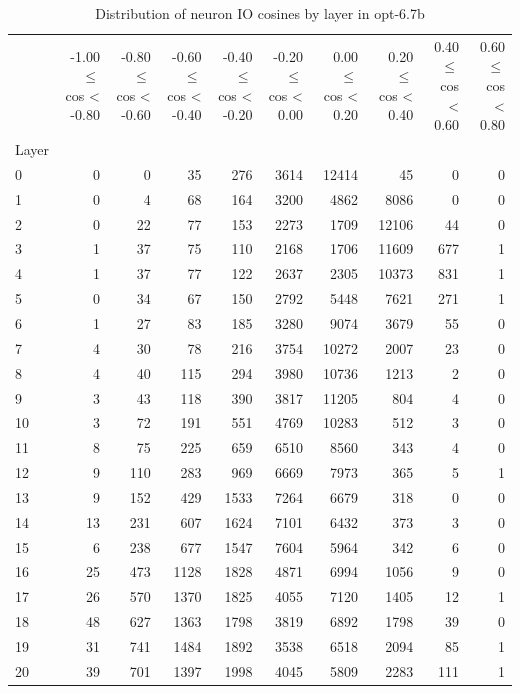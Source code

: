 \begin{table}
\caption{Distribution of neuron IO cosines by layer in opt-6.7b}
\label{tab:opt-6.7b_half_coarse}
\begin{tabular}{lrrrrrrrrr}
 & -1.00 $\leq$ cos < -0.80 & -0.80 $\leq$ cos < -0.60 & -0.60 $\leq$ cos < -0.40 & -0.40 $\leq$ cos < -0.20 & -0.20 $\leq$ cos < 0.00 & 0.00 $\leq$ cos < 0.20 & 0.20 $\leq$ cos < 0.40 & 0.40 $\leq$ cos < 0.60 & 0.60 $\leq$ cos < 0.80 \\
Layer &  &  &  &  &  &  &  &  &  \\
0 & 0 & 0 & 35 & 276 & 3614 & 12414 & 45 & 0 & 0 \\
1 & 0 & 4 & 68 & 164 & 3200 & 4862 & 8086 & 0 & 0 \\
2 & 0 & 22 & 77 & 153 & 2273 & 1709 & 12106 & 44 & 0 \\
3 & 1 & 37 & 75 & 110 & 2168 & 1706 & 11609 & 677 & 1 \\
4 & 1 & 37 & 77 & 122 & 2637 & 2305 & 10373 & 831 & 1 \\
5 & 0 & 34 & 67 & 150 & 2792 & 5448 & 7621 & 271 & 1 \\
6 & 1 & 27 & 83 & 185 & 3280 & 9074 & 3679 & 55 & 0 \\
7 & 4 & 30 & 78 & 216 & 3754 & 10272 & 2007 & 23 & 0 \\
8 & 4 & 40 & 115 & 294 & 3980 & 10736 & 1213 & 2 & 0 \\
9 & 3 & 43 & 118 & 390 & 3817 & 11205 & 804 & 4 & 0 \\
10 & 3 & 72 & 191 & 551 & 4769 & 10283 & 512 & 3 & 0 \\
11 & 8 & 75 & 225 & 659 & 6510 & 8560 & 343 & 4 & 0 \\
12 & 9 & 110 & 283 & 969 & 6669 & 7973 & 365 & 5 & 1 \\
13 & 9 & 152 & 429 & 1533 & 7264 & 6679 & 318 & 0 & 0 \\
14 & 13 & 231 & 607 & 1624 & 7101 & 6432 & 373 & 3 & 0 \\
15 & 6 & 238 & 677 & 1547 & 7604 & 5964 & 342 & 6 & 0 \\
16 & 25 & 473 & 1128 & 1828 & 4871 & 6994 & 1056 & 9 & 0 \\
17 & 26 & 570 & 1370 & 1825 & 4055 & 7120 & 1405 & 12 & 1 \\
18 & 48 & 627 & 1363 & 1798 & 3819 & 6892 & 1798 & 39 & 0 \\
19 & 31 & 741 & 1484 & 1892 & 3538 & 6518 & 2094 & 85 & 1 \\
20 & 39 & 701 & 1397 & 1998 & 4045 & 5809 & 2283 & 111 & 1 \\

\end{tabular}
\end{table}

